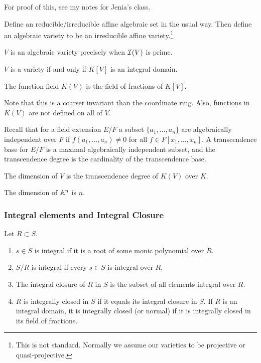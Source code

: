 \documentclass[10pt, twoside]{article}
\begin{document}
        For proof of this, see my notes for Jenia's class.

        Define an reducible/irreducible affine algebraic set in the usual way.
        Then define an algebraic variety to be an irreducible affine
        variety.\footnote{This is not standard. Normally we assume our
        varieties to be projective or quasi-projective.}

        \begin{prop} $V$ is an algebraic variety precisely when $\mathcal{I}(V)$ is
        prime.  \end{prop}

        \begin{cor} $V$ is a variety if and only if $K[V]$ is an integral
        domain.  \end{cor}

        \begin{defn} The function field $K(V)$ is the field of fractions of
        $K[V]$.  \end{defn}

        Note that this is a coarser invariant than the coordinate ring. Also,
        functions in $K(V)$ are not defined on all of $V$.

        Recall that for a field extension $E/F$ a subset $\{a_1, \ldots, a_n\}$
        are algebraically independent over $F$ if $f(a_1, \ldots, a_n) \neq 0$
        for all $f \in F[x_1, \ldots, x_n]$. A transcendence base for $E/F$ is
        a maximal algebraically independent subset, and the transcendence
        degree is the cardinality of the transcendence base.

        \begin{defn} The dimension of $V$ is the transcendence degree of $K(V)$
        over $K$.  \end{defn}

        \begin{exm} The dimension of $\mathbb{A}^n$ is $n$.  \end{exm}

        \subsubsection{Integral elements and Integral Closure}
        
       
        \begin{defn} Let $R \subset S$.  \begin{enumerate} \item $s \in S$ is
            integral if it is a root of some monic polynomial over $R$.  \item
            $S/R$ is integral if every $s \in S$ is integral over $R$.  \item
            The integral closure of $R$ in $S$ is the subset of all elements
            integral over $R$.  \item $R$ is integrally closed in $S$ if it
    equals its integral closure in $S$. If $R$ is an integral domain, it is
    integrally closed (or normal) if it is integrally closed in its field of
    fractions.  \end{enumerate} \end{defn}
\end{document}
